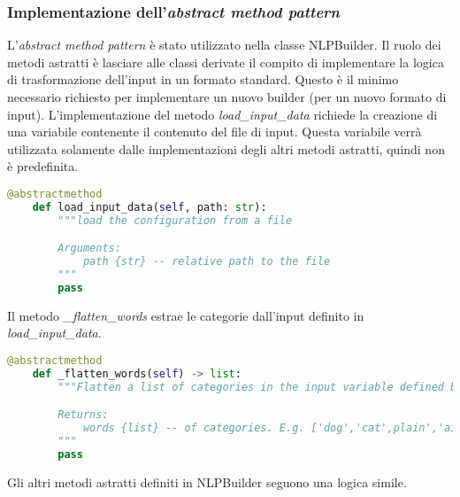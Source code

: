 \subsubsection*{Implementazione dell'\textit{abstract method pattern}}
L'\textit{abstract method pattern} è stato utilizzato nella classe NLPBuilder. Il ruolo dei metodi astratti è lasciare alle classi derivate il compito di implementare la logica di trasformazione dell'input in un formato standard. Questo è il minimo necessario richiesto per implementare un nuovo builder (per un nuovo formato di input).
\newline\newline
L'implementazione del metodo \textit{load\_input\_data} richiede la creazione di una variabile contenente il contenuto del file di input. Questa variabile verrà utilizzata solamente dalle implementazioni degli altri metodi astratti, quindi non è predefinita.
\begin{lstlisting}[language=python]
    @abstractmethod
    def load_input_data(self, path: str):
        """load the configuration from a file

        Arguments:
            path {str} -- relative path to the file
        """
        pass
\end{lstlisting}
Il metodo \textit{\_flatten\_words} estrae le categorie dall'input definito in \textit{load\_input\_data}.
\begin{lstlisting}[language=python]
    @abstractmethod
    def _flatten_words(self) -> list:
        """Flatten a list of categories in the input variable defined by load_input_data.

        Returns:
            words {list} -- of categories. E.g. ['dog','cat',plain','airplain']
        """
        pass
\end{lstlisting}
Gli altri metodi astratti definiti in NLPBuilder seguono una logica simile.

